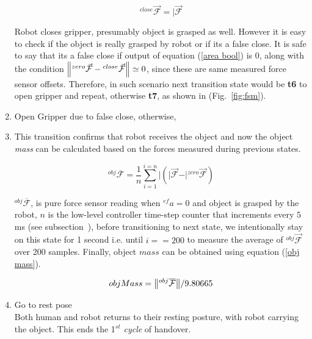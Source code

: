 \begin{enumerate}[start=0,label={\bf{t}\arabic*:}]
        \begin{equation}\label{Fclose}
        {}^{close}\vec{\mathcal{F}} = \vert{\vec{\mathcal{F}}}
        \end{equation}
    
    Robot closes gripper, presumably object is grasped as well. However it is easy to check if the object is really grasped by robot or if its a false close. It is safe to say that its a false close if output of equation (\ref{area bool}) is $0$, along with the condition $\norm{{}^{zero}\vec{\mathcal{F}}-{}^{close}\vec{\mathcal{F}}} \simeq{0}$, since these are same measured force sensor offsets. Therefore, in such scenario next transition state would be \textbf{t6} to open gripper and repeat, otherwise \textbf{t7}, as shown in (Fig.~\ref{fig:fsm}).
    
    \item Open Gripper due to false close, otherwise,
    
    \item This transition confirms that robot receives the object and now the object \textit{mass} can be calculated based on the forces measured during previous states.
    
    \begin{equation}
        {}^{obj}\overline{\mathcal{F}} = \frac{1}{n}\sum_{i=1}^{i=n} \vert{ (\vert{\vec{\mathcal{F}}} - \vert{{}^{zero}\vec{\mathcal{F}}}) }
    \end{equation}
    
    ${}^{obj}\overline{\mathcal{F}}$, is pure force sensor reading when ${}^{ef}a=0$ and object is grasped by the robot, $n$ is the low-level controller time-step counter that increments every $5$ms (see subsection~), before transitioning to next state, we intentionally stay on this state for 1 second i.e. until $i==200$ to measure the average of ${}^{obj}\vec{\mathcal{F}}$ over 200 samples. Finally, object $mass$ can be obtained using equation (\ref{obj mass}).
    
    \begin{equation}\label{obj mass}
        objMass = \norm{{}^{obj}\overline{\mathcal{F}}}/9.80665
    \end{equation}

    \item Go to rest pose \\
    Both human and robot returns to their resting posture, with robot carrying the object. This ends the 1$^{st}$ \textit{cycle} of handover.
    

\end{enumerate}
